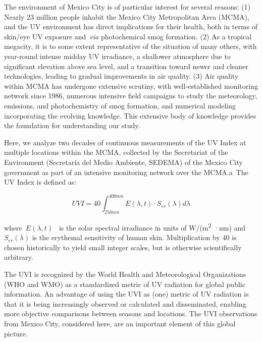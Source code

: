 \documentclass[10pt]{article}
\begin{document}
The environment of Mexico City is of particular interest for several
reasons: (1) Nearly 23 million people inhabit the Mexico City
Metropolitan Area (MCMA), and the UV environment has direct implications
for their health, both in terms of skin/eye UV exposure and~\emph{via}
photochemical smog formation. (2) As a tropical megacity, it is to some
extent representative of the situation of many others, with year-round
intense midday UV irradiance, a shallower atmosphere due to significant
elevation above sea level, and a transition toward newer and cleaner
technologies, leading to gradual improvements in air quality. (3) Air
quality within MCMA has undergone extensive scrutiny, with
well-established monitoring network since 1986,\cite{rama}
numerous intensive field campaigns to study the meteorology, emissions,
and photochemistry of smog formation,\cite{Doran_1998,Molina_2007,Molina_2010} and numerical
modeling incorporating the evolving knowledge.\cite{Jazcilevich_2005,Tie_2007,Zhang_2009,Zavala_2020} This
extensive body of knowledge provides the foundation for understanding
our study.

Here, we analyze two decades of continuous measurements of the UV Index
at multiple locations within the MCMA, collected by the Secretariat of
the Environment (Secretaría del Medio Ambiente, SEDEMA) of the Mexico
City government as part of an intensive monitoring network over the
MCMA.\cite{ambiente}a~The UV Index is defined as:

\begin{equation}
  \label{eq:UVI}
  UVI=40 \int_{250nm}^{400nm} E\left(\lambda,t\right) \cdot S_{er}(\lambda) d\lambda
\end{equation}

where~\(E(\lambda,t)\)\emph{~} is the solar spectral irradiance in
units of W/(m\textsuperscript{2} ·nm) and~\(S_{er}\left(\lambda\right)\) is the
erythemal sensitivity of human skin.\cite{who2002,Webb_2011} Multiplication by
40 is chosen historically to yield small integer scales, but is
otherwise scientifically arbitrary.

The UVI is recognized by the World Health and Meteorological
Organizations (WHO and WMO) as a standardized metric of UV
radiation\cite{who2002} for global public information. An advantage
of using the UVI as (one) metric of UV radiation is that it is being
increasingly observed or calculated and disseminated, enabling more
objective comparisons between seasons and locations. The UVI
observations from Mexico City, considered here, are an important element
of this global picture. ~
\end{document}
